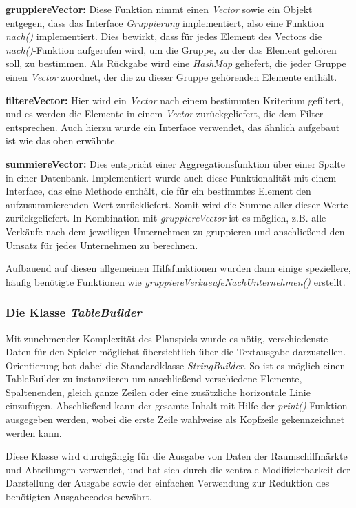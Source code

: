 \begin{seList}
\item \textbf{gruppiereVector:} Diese Funktion nimmt einen \textit{Vector} sowie ein Objekt entgegen, dass das Interface \textit{Gruppierung} implementiert, also eine Funktion \textit{nach()} implementiert. Dies bewirkt, dass für jedes Element des Vectors die \textit{nach()}-Funktion aufgerufen wird, um die Gruppe, zu der das Element gehören soll, zu bestimmen. Als Rückgabe wird eine \textit{HashMap} geliefert, die jeder Gruppe einen \textit{Vector} zuordnet, der die zu dieser Gruppe gehörenden Elemente enthält.
\item \textbf{filtereVector:} Hier wird ein \textit{Vector} nach einem bestimmten Kriterium gefiltert, und es werden die Elemente in einem \textit{Vector} zurückgeliefert, die dem Filter entsprechen. Auch hierzu wurde ein Interface verwendet, das ähnlich aufgebaut ist wie das oben erwähnte.
\item \textbf{summiereVector:} Dies entspricht einer Aggregationsfunktion über einer Spalte in einer Datenbank. Implementiert wurde auch diese Funktionalität mit einem Interface, das eine Methode enthält, die für ein bestimmtes Element den aufzusummierenden Wert zurückliefert. Somit wird die Summe aller dieser Werte zurückgeliefert. In Kombination mit \textit{gruppiereVector} ist es möglich, z.B. alle Verkäufe nach dem jeweiligen Unternehmen zu gruppieren und anschließend den Umsatz für jedes Unternehmen zu berechnen.
\end{seList}

Aufbauend auf diesen allgemeinen Hilfsfunktionen wurden dann einige speziellere, häufig benötigte Funktionen wie \textit{gruppiereVerkaeufeNachUnternehmen()} erstellt.

\subsubsection{Die Klasse \textit{TableBuilder}}
Mit zunehmender Komplexität des Planspiels wurde es nötig, verschiedenste Daten für den Spieler möglichst übersichtlich über die Textausgabe darzustellen. Orientierung bot dabei die Standardklasse \textit{StringBuilder}. So ist es möglich einen TableBuilder zu instanziieren um anschließend verschiedene Elemente, Spaltenenden, gleich ganze Zeilen oder eine zusätzliche horizontale Linie einzufügen. Abschließend kann der gesamte Inhalt mit Hilfe der \textit{print()}-Funktion ausgegeben werden, wobei die erste Zeile wahlweise als Kopfzeile gekennzeichnet werden kann.

Diese Klasse wird durchgängig für die Ausgabe von Daten der Raumschiffmärkte und Abteilungen verwendet, und hat sich durch die zentrale Modifizierbarkeit der Darstellung der Ausgabe sowie der einfachen Verwendung zur Reduktion des benötigten Ausgabecodes bewährt.

\autorende{}
